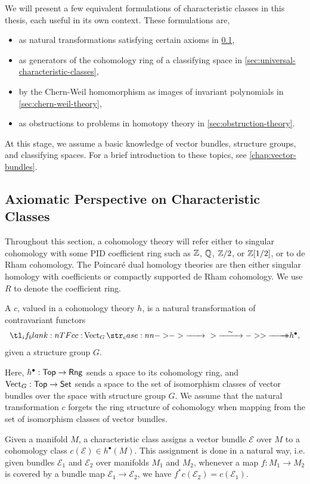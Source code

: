 We will present a few equivalent formulations of characteristic classes in this thesis, each useful in its own context. These formulations are,
\begin{itemize}
	\item as natural transformations satisfying certain axioms in \cref{sec:axiomatic-characteristic-classes},
	\item as generators of the cohomology ring of a classifying space in \cref{sec:universal-characteristic-classes},
	\item by the Chern-Weil homomorphism as images of invariant polynomials in \cref{sec:chern-weil-theory},
	\item as obstructions to problems in homotopy theory in \cref{sec:obstruction-theory}.
\end{itemize}
At this stage, we assume a basic knowledge of vector bundles, structure groups, and classifying spaces. For a brief introduction to these topics, see \cref{chap:vector-bundles}.

\subsection{Axiomatic Perspective on Characteristic Classes}\label{sec:axiomatic-characteristic-classes}

Throughout this section, a cohomology theory will refer either to singular cohomology with some PID coefficient ring such as $\mathbb{Z}$, $\mathbb{Q}$, $\mathbb{Z}/2$, or $\mathbb{Z}[1/2]$, or to de Rham cohomology. The Poincar\'e dual homology theories are then either singular homology with coefficients or compactly supported de Rham cohomology. We use $R$ to denote the coefficient ring.

\begin{definition}\label{defn:characteristic-class}
	A  $c$, valued in a cohomology theory $h$, is a natural transformation of contravariant functors
	\[
		\lkxfunc{c}{\Vect_G}{h^\bullet,}
	\]
	given a structure group $G$.
\end{definition}

Here, $h^\bullet : \mathsf{Top} \to \mathsf{Rng}$ sends a space to its  cohomology ring, and $\operatorname{Vect}_G : \mathsf{Top} \to \mathsf{Set}$ sends a space to the set of isomorphism classes of vector bundles over the space with structure group $G$. We assume that the natural transformation $c$ forgets the ring structure of cohomology when mapping from the set of isomorphism classes of vector bundles.

Given a manifold $M$, a characteristic class assigns a vector bundle $\mathcal{E}$ over $M$ to a cohomology class $c(\mathcal{E})\in h^\bullet(M)$.
This assignment is done in a natural way, i.e. given bundles $\mathcal{E}_1$ and $\mathcal{E}_2$ over manifolds $M_1$ and $M_2$, whenever a map $f : M_1 \to M_2$ is covered by a bundle map $\mathcal{E}_1 \to \mathcal{E}_2$, we have $f^* c(\mathcal{E}_2) = c(\mathcal{E}_1)$.

